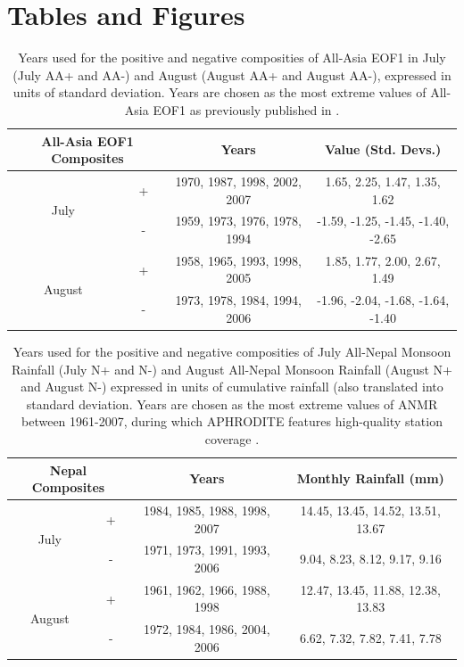 \newpage	
\section{Tables and Figures}


\begin{table}[p]

\caption{Years used for the positive and negative composities of All-Asia EOF1 in July (July AA+ and AA-) and August (August AA+ and August AA-), expressed in units of standard deviation. Years are chosen as the most extreme values of All-Asia EOF1 as previously published in \citet{Day2015}.}
\centering

\begin{tabular}{ c c c c}
	 	 		\multicolumn{2}{c}{All-Asia EOF1 Composites} 	&			Years				&		Value (Std. Devs.)			\tabularnewline	
				\hline
	 \multirow{2}{*}{July} 		&  +							&	1970, 1987, 1998, 2002, 2007 	&	1.65, 2.25, 1.47, 1.35, 1.62		\tabularnewline
	 						&  -							&	1959, 1973, 1976, 1978, 1994       &	-1.59, -1.25, -1.45, -1.40, -2.65	\tabularnewline
	 \multirow{2}{*}{August}	&  + 							&	1958, 1965, 1993, 1998, 2005	&	1.85, 1.77, 2.00, 2.67, 1.49		\tabularnewline
	 						&  -  							&	1973, 1978, 1984, 1994, 2006	&	-1.96, -2.04, -1.68, -1.64, -1.40 	\tabularnewline

\end{tabular}
\label{tab:t41}
\end{table}

\begin{table}[p]

\caption{Years used for the positive and negative composities of July All-Nepal Monsoon Rainfall (July N+ and N-) and August All-Nepal Monsoon Rainfall (August N+ and August N-) expressed in units of cumulative rainfall (also translated into standard deviation. Years are chosen as the most extreme values of ANMR between 1961-2007, during which APHRODITE features high-quality station coverage \citep{Day2015}.}
\centering

\begin{tabular}{ c c c c}
	 	 		\multicolumn{2}{c}{Nepal Composites} 	&			Years				&			Monthly Rainfall (mm)		\tabularnewline	
				\hline
	 \multirow{2}{*}{July} 		&  +						&	1984, 1985, 1988, 1998, 2007 	&	14.45, 13.45, 14.52, 13.51, 13.67		\tabularnewline
	 						&  -						&	1971, 1973, 1991, 1993, 2006       &	9.04, 8.23, 8.12, 9.17, 9.16 			\tabularnewline
	 \multirow{2}{*}{August}	&  + 						&	1961, 1962, 1966, 1988, 1998	&	12.47, 13.45, 11.88, 12.38, 13.83		\tabularnewline
	 						&  -  						&	1972, 1984, 1986, 2004, 2006	&	6.62, 7.32, 7.82, 7.41, 7.78			\tabularnewline

\end{tabular}
\label{tab:t41}
\end{table}

